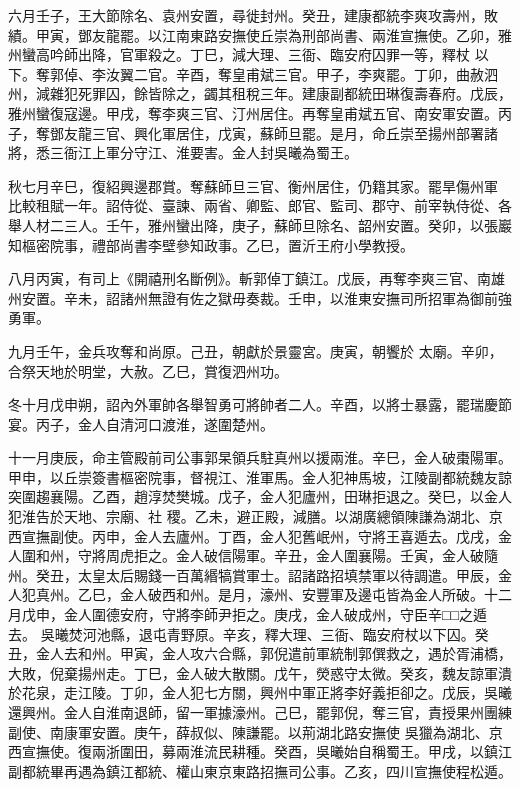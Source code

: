 \begin{pinyinscope}
 六月壬子，王大節除名、袁州安置，尋徙封州。癸丑，建康都統李爽攻壽州，敗績。甲寅，鄧友龍罷。以江南東路安撫使丘崇為刑部尚書、兩淮宣撫使。乙卯，雅州蠻高吟師出降，官軍殺之。丁巳，減大理、三衙、臨安府囚罪一等，釋杖
 以下。奪郭倬、李汝翼二官。辛酉，奪皇甫斌三官。甲子，李爽罷。丁卯，曲赦泗州，減雜犯死罪囚，餘皆除之，蠲其租稅三年。建康副都統田琳復壽春府。戊辰，雅州蠻復寇邊。甲戌，奪李爽三官、汀州居住。再奪皇甫斌五官、南安軍安置。丙子，奪鄧友龍三官、興化軍居住，戊寅，蘇師旦罷。是月，命丘崇至揚州部署諸將，悉三衙江上軍分守江、淮要害。金人封吳曦為蜀王。



 秋七月辛巳，復紹興邊郡賞。奪蘇師旦三官、衡州居住，仍籍其家。罷旱傷州軍
 比較租賦一年。詔侍從、臺諫、兩省、卿監、郎官、監司、郡守、前宰執侍從、各舉人材二三人。壬午，雅州蠻出降，庚子，蘇師旦除名、韶州安置。癸卯，以張巖知樞密院事，禮部尚書李壁參知政事。乙巳，置沂王府小學教授。



 八月丙寅，有司上《開禧刑名斷例》。斬郭倬丁鎮江。戊辰，再奪李爽三官、南雄州安置。辛未，詔諸州無證有佐之獄毋奏裁。壬申，以淮東安撫司所招軍為御前強勇軍。



 九月壬午，金兵攻奪和尚原。己丑，朝獻於景靈宮。庚寅，朝饗於
 太廟。辛卯，合祭天地於明堂，大赦。乙巳，賞復泗州功。



 冬十月戊申朔，詔內外軍帥各舉智勇可將帥者二人。辛酉，以將士暴露，罷瑞慶節宴。丙子，金人自清河口渡淮，遂圍楚州。



 十一月庚辰，命主管殿前司公事郭杲領兵駐真州以援兩淮。辛巳，金人破棗陽軍。甲申，以丘崇簽書樞密院事，督視江、淮軍馬。金人犯神馬坡，江陵副都統魏友諒突圍趨襄陽。乙酉，趙淳焚樊城。戊子，金人犯廬州，田琳拒退之。癸巳，以金人犯淮告於天地、宗廟、社
 稷。乙未，避正殿，減膳。以湖廣總領陳謙為湖北、京西宣撫副使。丙申，金人去廬州。丁酉，金人犯舊岷州，守將王喜遁去。戊戌，金人圍和州，守將周虎拒之。金人破信陽軍。辛丑，金人圍襄陽。壬寅，金人破隨州。癸丑，太皇太后賜錢一百萬緡犒賞軍士。詔諸路招填禁軍以待調遣。甲辰，金人犯真州。乙巳，金人破西和州。是月，濠州、安豐軍及邊屯皆為金人所破。十二月戊申，金人圍德安府，守將李師尹拒之。庚戌，金人破成州，守臣辛□□之遁去。
 吳曦焚河池縣，退屯青野原。辛亥，釋大理、三衙、臨安府杖以下囚。癸丑，金人去和州。甲寅，金人攻六合縣，郭倪遣前軍統制郭僎救之，遇於胥浦橋，大敗，倪棄揚州走。丁巳，金人破大散關。戊午，熒惑守太微。癸亥，魏友諒軍潰於花泉，走江陵。丁卯，金人犯七方關，興州中軍正將李好義拒卻之。戊辰，吳曦還興州。金人自淮南退師，留一軍據濠州。己巳，罷郭倪，奪三官，責授果州團練副使、南康軍安置。庚午，薛叔似、陳謙罷。以荊湖北路安撫使
 吳獵為湖北、京西宣撫使。復兩浙圍田，募兩淮流民耕種。癸酉，吳曦始自稱蜀王。甲戌，以鎮江副都統畢再遇為鎮江都統、權山東京東路招撫司公事。乙亥，四川宣撫使程松遁。




\end{pinyinscope}
